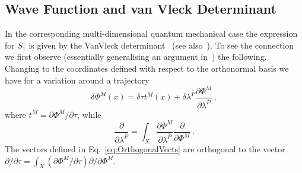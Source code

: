 \documentclass[a4paper,11pt]{article}
\numberwithin{equation}{section}
\newcommand{\citep}{\cite}
\begin{document}
\subsection{Wave Function and van Vleck Determinant}
\label{sec:VanVleckDeterminant}

In the corresponding multi-dimensional quantum mechanical case the expression for $S_{1}$ is given by the VanVleck determinant~\citep{VanVleck:1928zz} (see also~\cite{Brown:1971zzc}). To see the connection
we first observe (essentially generalising an argument in~\cite{Tanaka:1993ez})
the following. Changing to the coordinates defined with respect to the orthonormal basis we have for a variation around a trajectory
\begin{equation}
\delta\Phi^{M}(x)=\delta\tau t^{M}(x)+\delta\lambda^{\bar{P}}\frac{\partial\Phi^{M}}{\partial\lambda^{\bar{P}}} \,,\label{eq:deltaPhi}
\end{equation}
where $t^M=\partial \Phi^M/\partial \tau$, while 
\begin{equation}
\label{eq:OrthogonalVects}
\frac{\partial}{\partial\lambda^{\bar{P}}} = \int_{X} \frac{\partial\Phi^{M}}{\partial\lambda^{\bar{P}}}\frac{\partial}{\partial \Phi^{M}} \,.
\end{equation}
The vectors defined in Eq.~\eqref{eq:OrthogonalVects} are orthogonal to the vector $\partial/\partial\tau=\int_{X}\left(\partial\Phi^{M}/\partial\tau\right)\partial/\partial \Phi^{M}$.
\end{document}
